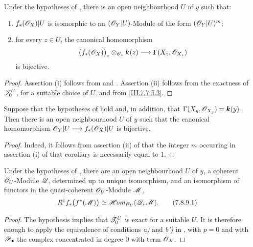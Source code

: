 \begin{corollary}[7.8.7]
\label{III.7.8.7}
Under the hypotheses of , there is an open
neighbourhood $U$ of $y$ such that:
\begin{enumerate}
  \item[\textup{(i)}] $f_*(\mathscr{O}_X)|U$ is isomorphic to an
  $(\mathscr{O}_Y|U)$-Module of the form $(\mathscr{O}_Y|U)^m$;
  \item[\textup{(ii)}] for every $z\in U$, the canonical
  homomorphism
  \[
    \bigl(f_*(\mathscr{O}_X)\bigr)_z
      \otimes_{\mathscr{O}_z}\boldsymbol{k}(z)
    \longrightarrow
    \Gamma(X_z,\mathscr{O}_{X_z})
  \]
  is bijective.
\end{enumerate}
\end{corollary}

\begin{proof}
Assertion (i) follows from  and
.  Assertion (ii) follows from the
exactness of $\mathscr{T}_0^U$, for a suitable choice of $U$,
and from \eqref{III.7.7.5.3}.
\end{proof}

\begin{corollary}[7.8.8]
\label{III.7.8.8}
Suppose that the hypotheses of  hold and,
in addition, that $\Gamma(X_y,\mathscr{O}_{X_y})=\boldsymbol{k}(y)$.
Then there is an open neighbourhood $U$ of $y$ such that
the canonical homomorphism $\mathscr{O}_Y|U\longrightarrow f_*(\mathscr{O}_X)|U$
is bijective.
\end{corollary}

\begin{proof}
Indeed, it follows from assertion (ii) of
 that the integer $m$ occurring in
assertion (i) of that corollary is necessarily equal to
$1$.
\end{proof}

\begin{corollary}[7.8.9]
\label{III.7.8.9}
Under the hypotheses of , there are an open
neighbourhood $U$ of $y$, a coherent $\mathscr{O}_U$-Module
$\mathscr{Q}$, determined up to unique isomorphism, and an
isomorphism of functors in the quasi-coherent
$\mathscr{O}_U$-Module $\mathscr{M}$,
\[
  R^1f_*\bigl(f^*(\mathscr{M})\bigr)
  \simeq
  \mathscr{H}\!\mathit{om}_{\mathscr{O}_U}(\mathscr{Q},\mathscr{M}).
  \tag{7.8.9.1}\label{III.7.8.9.1}
\]
\end{corollary}

\begin{proof}
The hypothesis implies that $\mathscr{T}_0^U$ is exact for a
suitable $U$.  It is therefore enough to apply the
equivalence of conditions \emph{a)} and \emph{b')} in
, with $p=0$ and with
$\mathscr{P}_\bullet$ the complex concentrated in degree $0$
with term $\mathscr{O}_X$.
\end{proof}


